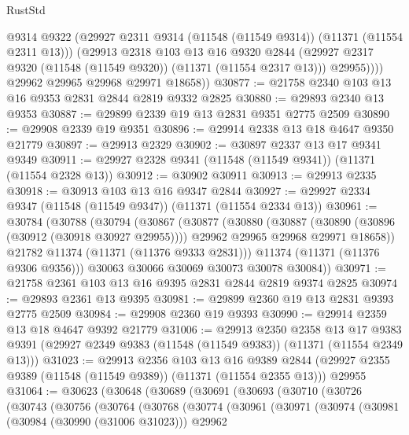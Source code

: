 \begin{lexlean}{RustStd}
\begin{coremodule}
              @9314
              @9322
              (@29927 @2311 @9314 (@11548 (@11549 @9314)) (@11371 (@11554 @2311 @13)))
              (@29913
                @2318
                @103
                @13
                @16
                @9320
                @2844
                (@29927 @2317 @9320 (@11548 (@11549 @9320)) (@11371 (@11554 @2317 @13)))
                @29955))))
        @29962
        @29965
        @29968
        @29971
        @18658))
@30877 := @21758 @2340 @103 @13 @16 @9353 @2831 @2844 @2819 @9332 @2825
@30880 := @29893 @2340 @13 @9353
@30887 := @29899 @2339 @19 @13 @2831 @9351 @2775 @2509
@30890 := @29908 @2339 @19 @9351
@30896 := @29914 @2338 @13 @18 @4647 @9350 @21779
@30897 := @29913 @2329
@30902 := @30897 @2337 @13 @17 @9341 @9349
@30911 := @29927 @2328 @9341 (@11548 (@11549 @9341)) (@11371 (@11554 @2328 @13))
@30912 := @30902 @30911
@30913 := @29913 @2335
@30918 := @30913 @103 @13 @16 @9347 @2844
@30927 := @29927 @2334 @9347 (@11548 (@11549 @9347)) (@11371 (@11554 @2334 @13))
@30961 := @30784
    (@30788
      (@30794
        (@30867
          (@30877
            (@30880
              (@30887
                (@30890 (@30896 (@30912 (@30918 @30927 @29955))))
                @29962
                @29965
                @29968
                @29971
                @18658))
            @21782
            @11374
            (@11371 (@11376 @9333 @2831)))
          @11374
          (@11371 (@11376 @9306 @9356)))
        @30063
        @30066
        @30069
        @30073
        @30078
        @30084))
@30971 := @21758 @2361 @103 @13 @16 @9395 @2831 @2844 @2819 @9374 @2825
@30974 := @29893 @2361 @13 @9395
@30981 := @29899 @2360 @19 @13 @2831 @9393 @2775 @2509
@30984 := @29908 @2360 @19 @9393
@30990 := @29914 @2359 @13 @18 @4647 @9392 @21779
@31006 := @29913
    @2350
    @2358
    @13
    @17
    @9383
    @9391
    (@29927 @2349 @9383 (@11548 (@11549 @9383)) (@11371 (@11554 @2349 @13)))
@31023 := @29913
    @2356
    @103
    @13
    @16
    @9389
    @2844
    (@29927 @2355 @9389 (@11548 (@11549 @9389)) (@11371 (@11554 @2355 @13)))
    @29955
@31064 := @30623
    (@30648
      (@30689
        (@30691
          (@30693
            (@30710
              (@30726
                (@30743
                  (@30756
                    (@30764
                      (@30768
                        (@30774
                          (@30961
                            (@30971
                              (@30974
                                (@30981
                                  (@30984 (@30990 (@31006 @31023)))
                                  @29962

\end{coremodule}
\end{lexlean}
